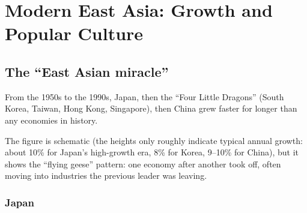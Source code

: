 \chapter{Modern East Asia: Growth and Popular Culture}

\section{The ``East Asian miracle''}

From the 1950s to the 1990s, Japan, then the ``Four Little Dragons'' (South Korea, Taiwan,
Hong Kong, Singapore), then China grew faster for longer than any economies in history.

\begin{center}
\end{center}

\begin{remark}
The figure is schematic (the heights only roughly indicate typical annual growth: about
10\% for Japan's high-growth era, 8\% for Korea, 9--10\% for China), but it shows the
``flying geese'' pattern: one economy after another took off, often moving into industries
the previous leader was leaving.
\end{remark}

\subsection{Japan}

